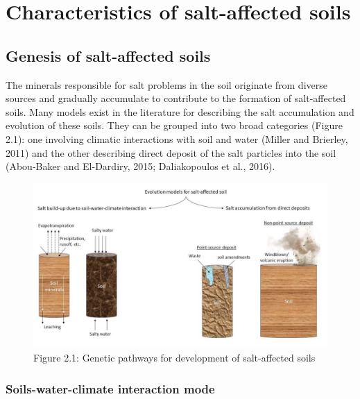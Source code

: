 \documentclass[
  10pt,
  b5paper,
]{book}
\begin{document}
\hypertarget{characteristics-of-salt-affected-soils}{%
\chapter{Characteristics of salt-affected soils}\label{characteristics-of-salt-affected-soils}}

\hypertarget{genesis-of-salt-affected-soils}{%
\section{Genesis of salt-affected soils}\label{genesis-of-salt-affected-soils}}

The minerals responsible for salt problems in the soil originate from diverse sources and gradually accumulate to contribute to the formation of salt-affected soils. Many models exist in the literature for describing the salt accumulation and evolution of these soils. They can be grouped into two broad categories (Figure 2.1): one involving climatic interactions with soil and water (Miller and Brierley, 2011) and the other describing direct deposit of the salt particles into the soil (Abou-Baker and El-Dardiry, 2015; Daliakopoulos et al., 2016).

\begin{figure}
\centering
\includegraphics{figures/images/Figure2.1.jpg}
\caption{Figure 2.1: Genetic pathways for development of salt-affected soils}
\end{figure}

\hypertarget{soils-water-climate-interaction-mode}{%
\subsection{Soils-water-climate interaction mode}\label{soils-water-climate-interaction-mode}}
\end{document}
